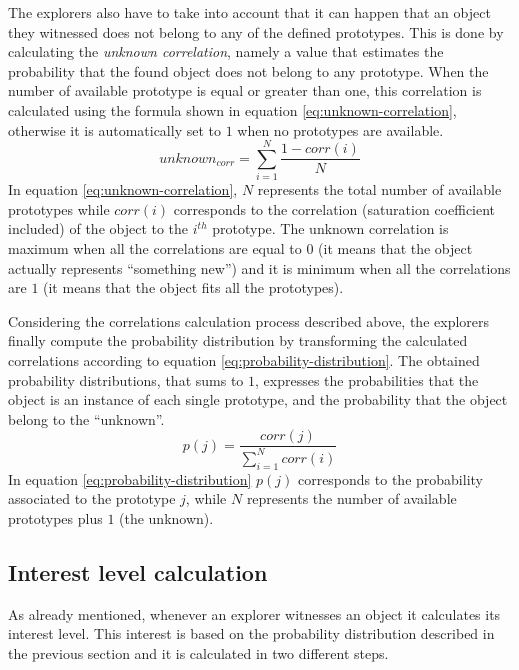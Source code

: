 \documentclass[a4paper, 10pt, conference]{ieeeconf}      %
\begin{document}
The explorers also have to take into account that it can happen that an object they witnessed does not belong to any of the defined prototypes. This is done by calculating the \emph{unknown correlation}, namely a value that estimates the probability that the found object does not belong to any prototype. When the number of available prototype is equal or greater than one, this correlation is calculated using the formula shown in equation \eqref{eq:unknown-correlation}, otherwise it is automatically set to $1$ when no prototypes are available. 
\begin{equation}\label{eq:unknown-correlation}
    unknown_{corr} = \sum_{i=1}^{N} \frac{1-corr(i)}{N}
\end{equation}
In equation \eqref{eq:unknown-correlation}, $N$ represents the total number of available prototypes while $corr(i)$ corresponds to the correlation (saturation coefficient included) of the object to the $i^{th}$ prototype. The unknown correlation is maximum when all the correlations are equal to $0$ (it means that the object actually represents ``something new'') and it is minimum when all the correlations are $1$ (it means that the object fits all the prototypes). 

Considering the correlations calculation process described above, the explorers finally compute the probability distribution by transforming the calculated correlations according to equation \eqref{eq:probability-distribution}. The obtained probability distributions, that sums to $1$, expresses the probabilities that the object is an instance of each single prototype, and the probability that the object belong to the ``unknown''.
\begin{equation}\label{eq:probability-distribution}
    p(j) = \frac{corr(j)}{\sum_{i=1}^{N}corr(i)}
\end{equation}
In equation \eqref{eq:probability-distribution} $p(j)$ corresponds to the probability associated to the prototype $j$, while $N$ represents the number of available prototypes plus $1$ (the unknown). 

\subsection{Interest level calculation}\label{sec:interest-calculation}
As already mentioned, whenever an explorer witnesses an object it calculates its interest level. This interest is based on the probability distribution described in the previous section and it is calculated in two different steps. 
\end{document}
